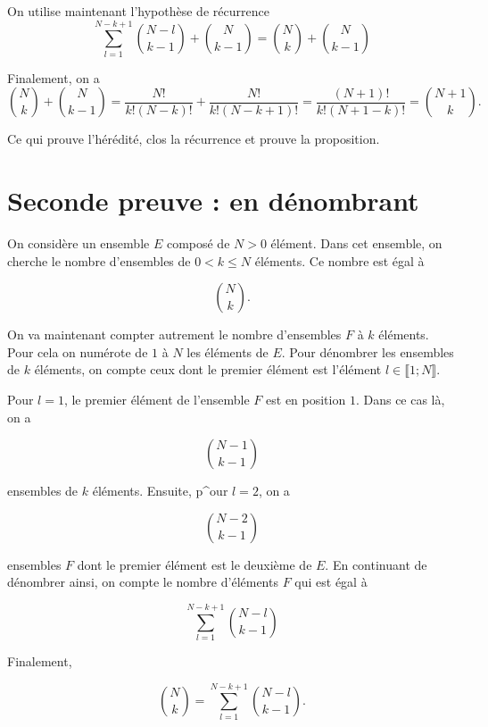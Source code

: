 \documentclass{article}
\begin{document}
On utilise maintenant l'hypothèse de récurrence
\begin{equation*}
\sum_{l=1}^{N-k+1} {N-l \choose k-1} + {N \choose k-1} = {N \choose k}+ {N \choose k-1}
\end{equation*}

Finalement, on a
\begin{equation*}
{N \choose k}+ {N \choose k-1}= \frac{N!}{k!(N-k)!} + \frac{N!}{k!(N-k+1)!} = \frac{(N+1)!}{k!(N+1-k)!} = {N+1 \choose k}.
\end{equation*}

Ce qui prouve l'hérédité, clos la récurrence et prouve la proposition.

\section{Seconde preuve :  en dénombrant}

On considère un ensemble $E$ composé de $N>0$ élément. Dans cet ensemble, on cherche le nombre d'ensembles de $0<k\leq N$ éléments. Ce nombre est égal à

\begin{equation*}
{N \choose k}.
\end{equation*}

On va maintenant compter autrement le nombre d'ensembles $F$ à $k$ éléments. Pour cela on numérote de $1$ à $N$ les éléments de $E$. Pour dénombrer les ensembles de $k$ éléments, on compte ceux dont le premier élément est l'élément $l \in  \llbracket 1;N \rrbracket$.

Pour $l=1$, le premier élément de l'ensemble $F$ est en position $1$. Dans ce cas là, on a 

\begin{equation*}
{N-1 \choose k-1}
\end{equation*}

ensembles de $k$ éléments. Ensuite, p^our $l=2$, on a 

\begin{equation*}
{N-2 \choose k-1}
\end{equation*}

ensembles $F$ dont le premier élément est le deuxième de $E$. En continuant de dénombrer ainsi, on compte le nombre d'éléments $F$ qui est égal à

\begin{equation*}
\sum_{l=1}^{N-k+1} {N-l \choose k-1}
\end{equation*}

Finalement,

\begin{equation*}
{N \choose k} = \sum_{l=1}^{N-k+1} {N-l \choose k-1}.
\end{equation*}
\end{document}
